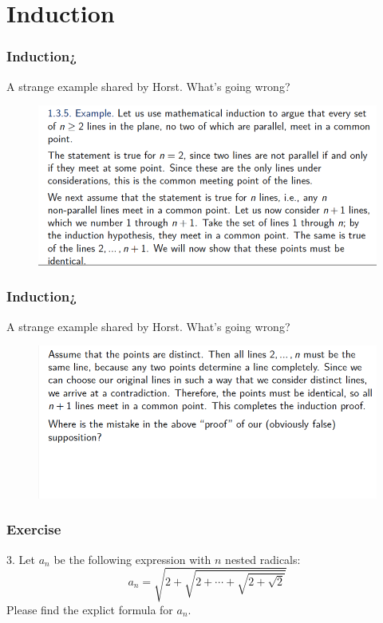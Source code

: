\documentclass[xcolor=table]{beamer}
\begin{document}
\section{Induction}
\begin{frame}
    \frametitle{Induction¿}
    \hspace{1em}
    A strange example shared by Horst. What's going wrong?
    \begin{figure}
        \centering
        \includegraphics[width=1\textwidth]{induction_1.png}
    \end{figure}
\end{frame}
\begin{frame}
    \frametitle{Induction¿}
    \hspace{1em}
    A strange example shared by Horst. What's going wrong?
    \begin{figure}
        \centering
        \includegraphics[width=1\textwidth]{induction_2.png}
    \end{figure}
\end{frame}
\begin{frame}
    \frametitle{Exercise}
    3. Let $ a_n$ be the following expression with $n$ nested radicals:\
    $$a_n=\sqrt{2+\sqrt{2+\cdots+\sqrt{2+\sqrt{2}}}}$$
    Please find the explict formula for $a_n$.
\end{frame}
\end{document}
